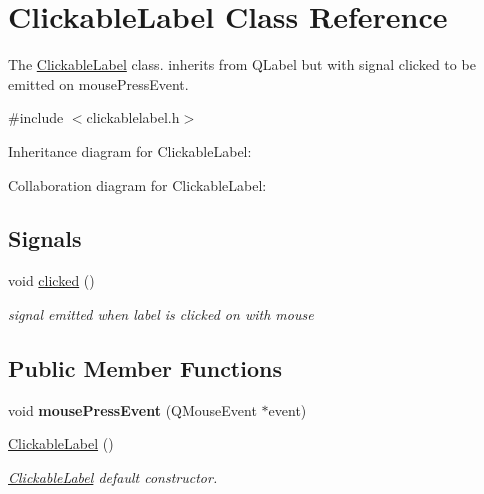 \hypertarget{classClickableLabel}{}\section{Clickable\+Label Class Reference}
\label{classClickableLabel}


The \hyperlink{classClickableLabel}{Clickable\+Label} class. inherits from Q\+Label but with signal clicked to be emitted on mouse\+Press\+Event.  




{\ttfamily \#include $<$clickablelabel.\+h$>$}



Inheritance diagram for Clickable\+Label\+:


Collaboration diagram for Clickable\+Label\+:
\subsection*{Signals}
\begin{DoxyCompactItemize}
\item 
\mbox{\label{classClickableLabel_aba68cb811a595c6d90f5c994f2b31f4b}} 
void \hyperlink{classClickableLabel_aba68cb811a595c6d90f5c994f2b31f4b}{clicked} ()
\begin{DoxyCompactList}\small\item\em signal emitted when label is clicked on with mouse \end{DoxyCompactList}\end{DoxyCompactItemize}
\subsection*{Public Member Functions}
\begin{DoxyCompactItemize}
\item 
\mbox{\label{classClickableLabel_a602a8b3a3fa31497f31e549d46576524}} 
void {\bfseries mouse\+Press\+Event} (Q\+Mouse\+Event $\ast$event)
\item 
\mbox{\label{classClickableLabel_a38070f5a2992348fe3fd453f674fb38e}} 
\hyperlink{classClickableLabel_a38070f5a2992348fe3fd453f674fb38e}{Clickable\+Label} ()
\begin{DoxyCompactList}\small\item\em \hyperlink{classClickableLabel}{Clickable\+Label} default constructor. \end{DoxyCompactList}\end{DoxyCompactItemize}


